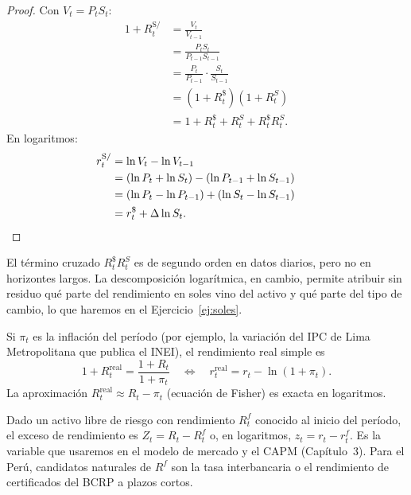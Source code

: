 \begin{proof}
Con $V_t=P_tS_t$:
\begin{align*}
  1+R^{\mathrm{S/}}_t &= \frac{V_t}{V_{t-1}}\\
                      &= \frac{P_tS_t}{P_{t-1}S_{t-1}}\\
                      &= \frac{P_t}{P_{t-1}}\cdot\frac{S_t}{S_{t-1}}\\
                      &= (1+R^{\$}_t)(1+R^{S}_t)\\
                      &= 1+R^{\$}_t+R^{S}_t+R^{\$}_tR^{S}_t.
\end{align*}
En logaritmos:
\begin{align*}
  r^{\mathrm{S/}}_t &= \ln V_t-\ln V_{t-1}\\
                    &= (\ln P_t+\ln S_t)-(\ln P_{t-1}+\ln S_{t-1})\\
                    &= (\ln P_t-\ln P_{t-1})+(\ln S_t-\ln S_{t-1})\\
                    &= r^{\$}_t+\Delta\ln S_t. && \qedhere
\end{align*}
\end{proof}

El término cruzado $R^{\$}_tR^{S}_t$ es de segundo orden en datos diarios, pero no en horizontes largos.
La descomposición logarítmica, en cambio, permite atribuir sin residuo qué parte del rendimiento en soles
vino del activo y qué parte del tipo de cambio, lo que haremos en el Ejercicio~\ref{ej:soles}.

\begin{definicion}
Si $\pi_t$ es la inflación del período (por ejemplo, la variación del IPC de Lima Metropolitana que
publica el INEI), el rendimiento real simple es
\[
  1+R^{\mathrm{real}}_t=\frac{1+R_t}{1+\pi_t}
  \quad\Longleftrightarrow\quad
  r^{\mathrm{real}}_t=r_t-\ln(1+\pi_t).
\]
La aproximación $R^{\mathrm{real}}_t\approx R_t-\pi_t$ (ecuación de Fisher) es exacta en logaritmos.
\end{definicion}

\begin{definicion}\label{def:exceso}
Dado un activo libre de riesgo con rendimiento $R^{f}_t$ conocido al inicio del período, el exceso de
rendimiento es $Z_t=R_t-R^f_t$ o, en logaritmos, $z_t=r_t-r^f_t$. Es la variable que usaremos en el
modelo de mercado y el CAPM (Capítulo~3). Para el Perú, candidatos naturales de $R^f$ son la tasa
interbancaria o el rendimiento de certificados del BCRP a plazos cortos.
\end{definicion}

